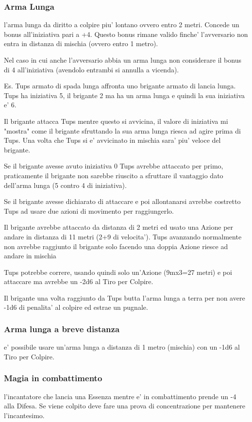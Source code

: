 \documentclass[a4paper,11pt,twoside,openany]{book}
\begin{document}
\subsubsection{Arma Lunga} l'arma lunga da diritto a colpire piu' lontano ovvero entro 2 metri. Concede un bonus all'iniziativa pari a +4. Questo bonus rimane valido finche' l'avversario non entra in distanza di mischia (ovvero entro 1 metro).

Nel caso in cui anche l'avversario abbia un arma lunga non considerare il bonus di 4 all'iniziativa (avendolo entrambi si annulla a vicenda).

Es. Tups armato di spada lunga affronta uno brigante armato di lancia lunga. Tups ha iniziativa 5, il brigante 2 ma ha un arma lunga e quindi la sua iniziativa e' 6.

Il brigante attacca Tups mentre questo si avvicina, il valore di iniziativa mi "mostra" come il brigante sfruttando la sua arma lunga riesca ad agire prima di Tups. Una volta che Tups si e' avvicinato in mischia sara' piu' veloce del brigante.

Se il brigante avesse avuto iniziativa 0 Tups avrebbe attaccato per primo, praticamente il brigante non sarebbe riuscito a sfruttare il vantaggio dato dell'arma lunga (5 contro 4 di iniziativa).

Se il brigante avesse dichiarato di attaccare e poi allontanarsi avrebbe costretto Tups ad usare due azioni di movimento per raggiungerlo.

Il brigante avrebbe attaccato da distanza di 2 metri ed usato una Azione per andare in distanza di 11 metri (2+9 di velocita'). Tups avanzando normalmente non avrebbe raggiunto il brigante solo facendo una doppia Azione riesce ad andare in mischia

Tups potrebbe correre, usando quindi solo un'Azione (9mx3=27 metri) e poi attaccare ma avrebbe un -2d6 al Tiro per Colpire.

Il brigante una volta raggiunto da Tups butta l'arma lunga a terra per non avere -1d6 di penalita' al colpire ed estrae un pugnale.

\subsubsection{Arma lunga a breve distanza} e' possibile usare un'arma lunga a distanza di 1 metro (mischia) con un -1d6 al Tiro per Colpire.

\subsubsection{Magia in combattimento} l'incantatore che lancia una Essenza mentre e' in combattimento prende un -4 alla Difesa. Se viene colpito deve fare una prova di concentrazione per mantenere l'incantesimo.
\end{document}
